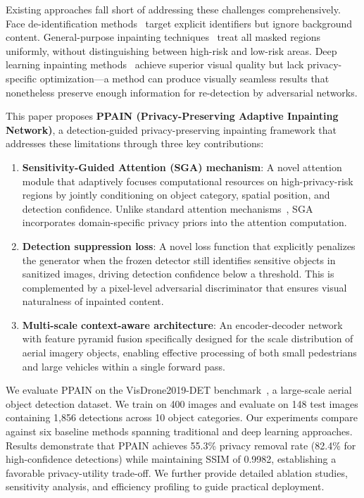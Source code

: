 \documentclass[preprint,12pt]{elsarticle}
\begin{document}
Existing approaches fall short of addressing these challenges comprehensively. Face de-identification methods~\cite{du2014face,li2019face} target explicit identifiers but ignore background content. General-purpose inpainting techniques~\cite{criminisi2004region,telea2004imageinpainting,suvorov2022lama} treat all masked regions uniformly, without distinguishing between high-risk and low-risk areas. Deep learning inpainting methods~\cite{yu2018free,li2022mat} achieve superior visual quality but lack privacy-specific optimization---a method can produce visually seamless results that nonetheless preserve enough information for re-detection by adversarial networks.

This paper proposes \textbf{PPAIN (Privacy-Preserving Adaptive Inpainting Network)}, a detection-guided privacy-preserving inpainting framework that addresses these limitations through three key contributions:

\begin{enumerate}
    \item \textbf{Sensitivity-Guided Attention (SGA) mechanism}: A novel attention module that adaptively focuses computational resources on high-privacy-risk regions by jointly conditioning on object category, spatial position, and detection confidence. Unlike standard attention mechanisms~\cite{woo2018cbam,hu2018squeeze}, SGA incorporates domain-specific privacy priors into the attention computation.

    \item \textbf{Detection suppression loss}: A novel loss function that explicitly penalizes the generator when the frozen detector still identifies sensitive objects in sanitized images, driving detection confidence below a threshold. This is complemented by a pixel-level adversarial discriminator that ensures visual naturalness of inpainted content.

    \item \textbf{Multi-scale context-aware architecture}: An encoder-decoder network with feature pyramid fusion specifically designed for the scale distribution of aerial imagery objects, enabling effective processing of both small pedestrians and large vehicles within a single forward pass.
\end{enumerate}

We evaluate PPAIN on the VisDrone2019-DET benchmark~\cite{visdrone2019}, a large-scale aerial object detection dataset. We train on 400 images and evaluate on 148 test images containing 1,856 detections across 10 object categories. Our experiments compare against six baseline methods spanning traditional and deep learning approaches. Results demonstrate that PPAIN achieves 55.3\% privacy removal rate (82.4\% for high-confidence detections) while maintaining SSIM of 0.9982, establishing a favorable privacy-utility trade-off. We further provide detailed ablation studies, sensitivity analysis, and efficiency profiling to guide practical deployment.
\end{document}
